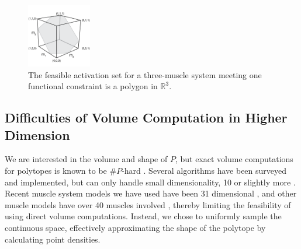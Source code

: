 \begin{figure}[ht]
  \label{fig:fig_hr}
   \begin{center}
    \includegraphics[width=0.25\textwidth]{sections/figs/feasibleactivation.png}
  \end{center}
  \caption{The feasible activation set for a  three-muscle system meeting one functional constraint is a polygon in $\mathbb{R}^3$.} %
\end{figure}

\subsection{Difficulties of Volume Computation in Higher Dimension}

We are interested in the volume and shape of $P$, but exact volume computations for polytopes is known to be $\#P$-hard \cite{Dyer}.
Several algorithms have been surveyed and implemented, but can only handle small dimensionality, 10 or slightly more \cite{Bueler2}.  
Recent muscle system models we have used have been 31 dimensional \cite{Valero-Cuevas2015high-dimensional}, and other muscle models have over 40 muscles involved \cite{arnold2010model, kutch2012challenges, hamner2010muscle, de2014human}, thereby limiting the feasibility of using direct volume computations. Instead, we chose to uniformly sample the continuous space, effectively approximating the shape of the polytope by calculating point densities.

